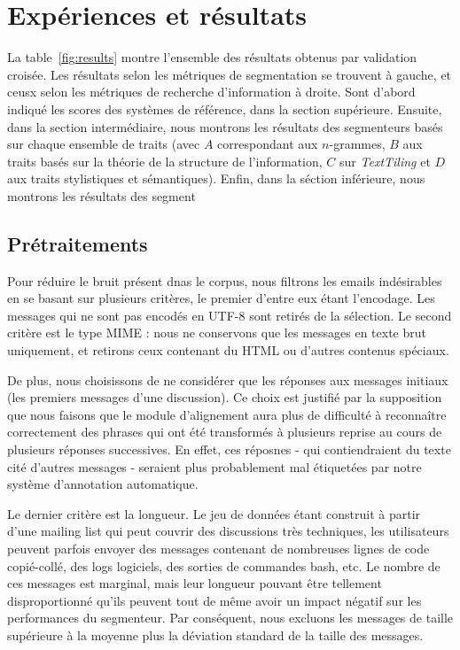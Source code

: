 
\chapter{Expériences et résultats}

\label{ch:experiments_and_results}

La table~\ref{fig:results} montre l'ensemble des résultats obtenus par validation croisée. Les résultats selon les métriques de segmentation se trouvent à gauche, et ceusx selon les métriques de recherche d'information à droite. Sont d'abord indiqué les scores des systèmes de référence, dans la section supérieure. Ensuite, dans la section intermédiaire, nous montrons les résultats des segmenteurs basés sur chaque ensemble de traits (avec $A$ correspondant aux $n$-grammes, $B$ aux traits basés sur la théorie de la structure de l'information, $C$ sur \textit{TextTiling} et $D$ aux traits stylistiques et sémantiques). Enfin, dans la séction inférieure, nous montrons les résultats des segment

\section{Prétraitements}

Pour réduire le bruit présent dnas le corpus, nous filtrons les emails indésirables en se basant sur plusieurs critères, le premier d'entre eux étant l'encodage. Les messages qui ne sont pas encodés en UTF-8 sont retirés de la sélection. Le second critère est le type MIME : nous ne conservons que les messages en texte brut uniquement, et retirons ceux contenant du HTML ou d'autres contenus spéciaux.

De plus, nous choisissons de ne considérer que les réponses aux messages initiaux (les premiers messages d'une discussion). Ce choix est justifié par la supposition que nous faisons que le module d'alignement aura plus de difficulté à reconnaître correctement des phrases qui ont été transformés à plusieurs reprise au cours de plusieurs réponses successives. En effet, ces réposnes - qui contiendraient du texte cité d'autres messages - seraient plus probablement mal étiquetées par notre système d'annotation automatique.

Le dernier critère est la longueur. Le jeu de données étant construit à partir d'une mailing list qui peut couvrir des discussions très techniques, les utilisateurs peuvent parfois envoyer des messages contenant de nombreuses lignes de code copié-collé, des logs logiciels, des sorties de commandes bash, etc. Le nombre de ces messages est marginal, mais leur longueur pouvant être tellement disproportionné qu'ils peuvent tout de même avoir un impact négatif sur les performances du segmenteur. Par conséquent, nous excluons les messages de taille supérieure à la moyenne plus la déviation standard de la taille des messages.

